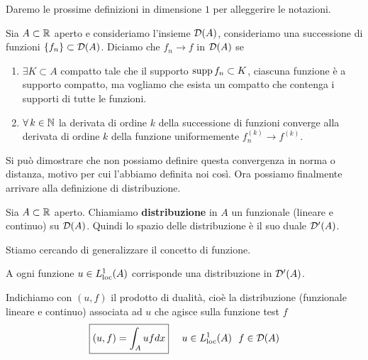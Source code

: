 Daremo le prossime definizioni in dimensione $1$ per alleggerire le notazioni.
\begin{defn}
[Convergenza in $\Dc$]Sia $A\subset \mathbb{R}$ aperto e consideriamo l'insieme $\mathcal{D}(A)$, consideriamo una successione di funzioni $\{f_{n}\} \subset \mathcal{D}(A)$. Diciamo che $f_{n}\rightarrow f$ in $\mathcal{D}(A)$ se
\begin{enumerate}
\item $\exists K\subset A$ compatto tale che il supporto $\operatorname*{supp} f_{n} \subset K$, ciascuna funzione è a supporto compatto, ma vogliamo che esista un compatto che contenga i supporti di tutte le funzioni.
\item $\forall k\in \NN$ la derivata di ordine $k$ della successione di funzioni converge alla derivata di ordine $k$ della funzione uniformemente $f^{(k)}_{n}\rightarrow f^{(k)}$.
\end{enumerate}
\end{defn}
Si può dimostrare che non possiamo definire questa convergenza in norma o distanza, motivo per cui l'abbiamo definita noi così. Ora possiamo finalmente arrivare alla definizione di distribuzione.
\begin{defn}
[Distribuzione]
Sia $A\subset \mathbb{R}$ aperto. Chiamiamo \textbf{distribuzione} in $A$ un funzionale (lineare e continuo) su $\mathcal{D}(A)$. Quindi lo spazio delle distribuzione è il suo duale $\mathcal{D}'(A)$.
\end{defn}
Stiamo cercando di generalizzare il concetto di funzione.
\begin{thm}
A ogni funzione $u\in L^{1}_{\operatorname{loc}}(A)$ corrisponde una distribuzione in $\mathcal{D}'(A)$.

Indichiamo con $(u, f)$ il prodotto di dualità, cioè la distribuzione (funzionale lineare e continuo) associata ad $u$ che agisce sulla funzione test $f$
\begin{equation*}
\boxed{(u, f) = \int_{A} ufdx} \ \ \ \ u\in L^{1}_{\operatorname{loc}}(A) \ \ f\in \mathcal{D}(A)
\end{equation*}
\end{thm}

